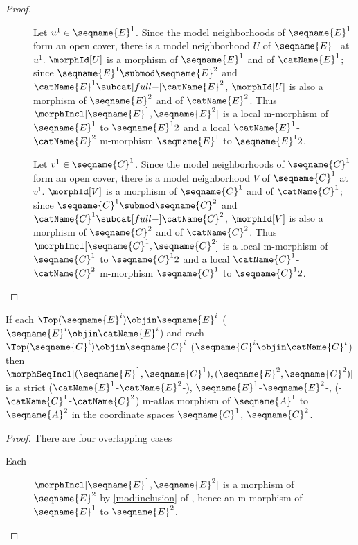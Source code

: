 \documentclass{article}
\begin{document}
\begin{lemma}
\begin{proof}
\begin{description}
\item%
  [
    \ensuremath
      {
        \morphSeqIncl%
          [
            {(\seqname{E}^1, \seqname{C}^1)},
            {(\seqname{E}^2, \seqname{C}^2)}
          ]
      }
    is semi-strict:
  ]

Let $u^1 \in \seqname{E}^1$. Since the model neighborhoods of
$\seqname{E}^1$ form an open cover, there is a model neighborhood $U$ of
$\seqname{E}^1$ at $u^1$. $\morphId[{U}]$ is a morphism of $\seqname{E}^1$
and of $\catName{E}^1$; since $\seqname{E}^1 \submod \seqname{E}^2$ and
$\catName{E}^1 \subcat[full-] \catName{E}^2$, $\morphId[{U}]$ is also a
morphism of $\seqname{E}^2$ and of $\catName{E}^2$. Thus
$
\morphIncl%
  [
    {\seqname{E}^1},
    {\seqname{E}^2}
  ]
$
is a local m-morphism of $\seqname{E}^1$ to $\seqname{E}^12$ and a local
$\catName{E}^1$-$\catName{E}^2$ m-morphism $\seqname{E}^1$ to $\seqname{E}^12$.

Let $v^1 \in \seqname{C}^1$. Since the model neighborhoods of
$\seqname{C}^1$ form an open cover, there is a model neighborhood $V$ of
$\seqname{C}^1$ at $v^1$. $\morphId[{V}]$ is a morphism of $\seqname{C}^1$
and of $\catName{C}^1$; since $\seqname{C}^1 \submod \seqname{C}^2$ and
$\catName{C}^1 \subcat[full-] \catName{C}^2$, $\morphId[{V}]$ is also a
morphism of $\seqname{C}^2$ and of $\catName{C}^2$. Thus
$
  \morphIncl%
    [
      {\seqname{C}^1},
      {\seqname{C}^2}
    ]
$
is a local m-morphism of $\seqname{C}^1$ to $\seqname{C}^12$ and a local
$\catName{C}^1$-$\catName{C}^2$ m-morphism $\seqname{C}^1$ to $\seqname{C}^12$.

\end{description}
\end{proof}

If each $\Top(\seqname{E}^i) \objin \seqname{E}^i$
($\seqname{E}^i \objin \catName{E}^i$)
and each $\Top(\seqname{C}^i) \objin \seqname{C}^i$
($\seqname{C}^i \objin \catName{C}^i$) then
$
  \morphSeqIncl%
    [
      {(\seqname{E}^1, \seqname{C}^1)},
      {(\seqname{E}^2, \seqname{C}^2)}
    ]
$
is a strict
\nobreaks
  {
    {($\catName{E}^1$-$\catName{E}^2$-)},
    {$\seqname{E}^1$-$\seqname{E}^2$-},
    {(-$\catName{C}^1$-$\catName{C}^2$)}
  }
m-atlas morphism of
$\seqname{A}^1$ to $\seqname{A}^2$ in the coordinate spaces
$\seqname{C}^1$, $\seqname{C}^2$.

\begin{proof}
There are four overlapping cases
\begin{description}
\item%
  [
    Each
    \ensuremath
      {
        \Top{\seqname{E}^i} \objin \seqname{E}^i
      }:
  ]
$\morphIncl[{\seqname{E}^1},{\seqname{E}^2}]$ is a morphism of
$\seqname{E}^2$ by \cref{mod:inclusion} of
{
  \showlabelsinline
},
hence an m-morphism of $\seqname{E}^1$ to $\seqname{E}^2$.


\end{description}
\end{proof}
\end{lemma}
\end{document}
